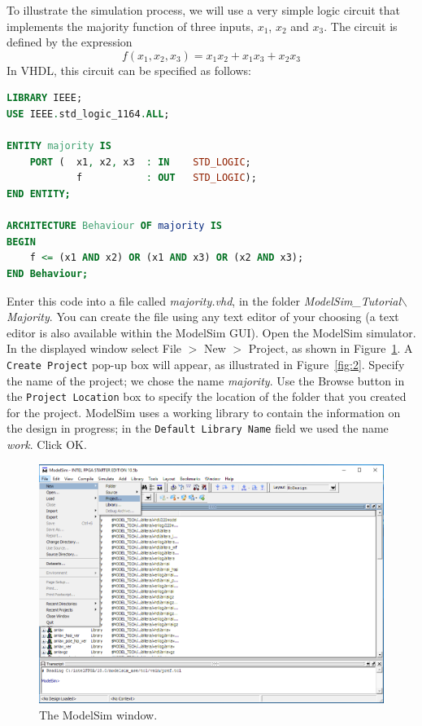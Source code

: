 \documentclass[11pt, twoside, pdftex]{article}
\begin{document}
To illustrate the simulation process, we will use a very simple logic circuit that 
implements the majority function of three inputs, $x_1$, $x_2$ and $x_3$. The circuit
is defined by the expression
$$
f(x_1, x_2, x_3) = x_1 x_2 + x_1 x_3 + x_2 x_3
$$
\noindent
In VHDL, this circuit can be specified as follows:
\begin{lstlisting}[language=VHDL]
LIBRARY IEEE;
USE IEEE.std_logic_1164.ALL;

ENTITY majority IS
    PORT (  x1, x2, x3  : IN    STD_LOGIC;
            f           : OUT   STD_LOGIC);
END ENTITY;

ARCHITECTURE Behaviour OF majority IS
BEGIN
    f <= (x1 AND x2) OR (x1 AND x3) OR (x2 AND x3);
END Behaviour;
\end{lstlisting}
\noindent
Enter this code into a file called {\it majority.vhd}, in the folder 
{\it ModelSim\_Tutorial$\backslash$Majority}.
You can create the file using any text 
editor of your choosing (a text editor is also available within the ModelSim GUI).
Open the ModelSim simulator. In the displayed window select {\sf File $>$ New $>$ Project},
as shown in Figure~\ref{fig:1}.
A \texttt{Create Project} pop-up box will appear, as illustrated in Figure~\ref{fig:2}. 
Specify the name of the project; we chose the name {\it majority}. 
Use the {\sf Browse} button in the \texttt{Project Location} box to specify the location
of the folder that you created for the project.
ModelSim uses a working library to contain the information on the design 
in progress; in the \texttt{Default Library Name} field we used the name {\it work}.
Click {\sf OK}.

\begin{figure}[H]
   \begin{center}
      \includegraphics[scale=0.65]{figures/figure1.png}
   \caption{The ModelSim window.} 
	 \label{fig:1}
	 \end{center}
\end{figure}
\end{document}
